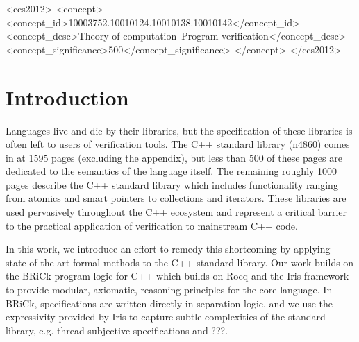 \documentclass[sigplan,screen]{acmart}
\begin{document}
\begin{CCSXML}
<ccs2012>
<concept>
<concept_id>10003752.10010124.10010138.10010142</concept_id>
<concept_desc>Theory of computation~Program verification</concept_desc>
<concept_significance>500</concept_significance>
</concept>
</ccs2012>
\end{CCSXML}



\maketitle

\section{Introduction}
Languages live and die by their libraries, but the specification of these libraries is often left to users of verification tools.
The C++ standard library (n4860) comes in at 1595 pages (excluding the appendix), but less than 500 of these pages are dedicated to the semantics of the language itself.
The remaining roughly 1000 pages describe the C++ standard library which includes functionality ranging from atomics and smart pointers to collections and iterators.
These libraries are used pervasively throughout the C++ ecosystem and represent a critical barrier to the practical application of verification to mainstream C++ code.

In this work, we introduce an effort to remedy this shortcoming by applying state-of-the-art formal methods to the C++ standard library.
Our work builds on the BRiCk program logic for C++ which builds on Rocq and the Iris framework to provide modular, axiomatic, reasoning principles for the core language.
In BRiCk, specifications are written directly in separation logic, and we use the expressivity provided by Iris to capture subtle complexities of the standard library, e.g. thread-subjective specifications and ???.
\end{document}
